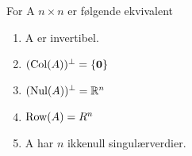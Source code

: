 For A $n\times n$ er følgende ekvivalent
\begin{enumerate}
  \item A er invertibel.
  \item $(\text{Col}(A))^\perp = \{\mathbf{0}\}$
  \item $(\text{Nul}(A))^\perp = \mathbb{R}^n$
  \item $\text{Row}(A) = R^n$
  \item A har $n$ ikkenull singulærverdier.
\end{enumerate}
